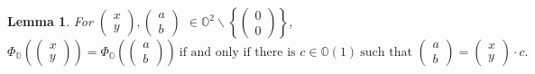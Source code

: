 \documentclass[a4paper]{article}%
\newtheorem{lemma}[theorem]{Lemma}
\begin{document}
\begin{lemma}
\label{OctonionFiberLemma} For $%
\begin{pmatrix}
x\\
y
\end{pmatrix}
,%
\begin{pmatrix}
a\\
b
\end{pmatrix}
$ $\in\mathbb{O}^{2}\smallsetminus\left\{
\begin{pmatrix}
0\\
0
\end{pmatrix}
\right\}  $,
\[
\Phi_{\mathbb{O}}\left(
\begin{pmatrix}
x\\
y
\end{pmatrix}
\right)  =\Phi_{\mathbb{O}}\left(
\begin{pmatrix}
a\\
b
\end{pmatrix}
\right)  \ \text{if and only if there is\ }c\in\mathbb{O}(1)\mathbb{\ }%
\text{such that }%
\begin{pmatrix}
a\\
b
\end{pmatrix}
=%
\begin{pmatrix}
x\\
y
\end{pmatrix}
\cdot c\text{.}%
\]

\end{lemma}
\end{document}
